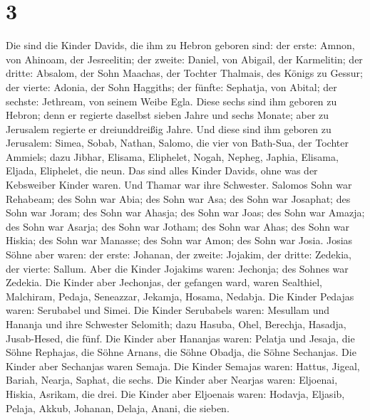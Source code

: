\hypertarget{section-2}{%
\section{3}\label{section-2}}

 Die sind die Kinder Davids, die ihm zu Hebron geboren sind:
der erste: Amnon, von Ahinoam, der Jesreelitin; der zweite: Daniel, von
Abigail, der Karmelitin;  der dritte: Absalom, der Sohn
Maachas, der Tochter Thalmais, des Königs zu Gessur; der vierte: Adonia,
der Sohn Haggiths;  der fünfte: Sephatja, von Abital; der
sechste: Jethream, von seinem Weibe Egla.  Diese sechs sind
ihm geboren zu Hebron; denn er regierte daselbst sieben Jahre und sechs
Monate; aber zu Jerusalem regierte er dreiunddreißig Jahre. 
Und diese sind ihm geboren zu Jerusalem: Simea, Sobab, Nathan, Salomo,
die vier von Bath-Sua, der Tochter Ammiels;  dazu Jibhar,
Elisama, Eliphelet,  Nogah, Nepheg, Japhia, 
Elisama, Eljada, Eliphelet, die neun.  Das sind alles Kinder
Davids, ohne was der Kebsweiber Kinder waren. Und Thamar war ihre
Schwester.  Salomos Sohn war Rehabeam; des Sohn war Abia;
des Sohn war Asa; des Sohn war Josaphat;  des Sohn war
Joram; des Sohn war Ahasja; des Sohn war Joas;  des Sohn
war Amazja; des Sohn war Asarja; des Sohn war Jotham;  des
Sohn war Ahas; des Sohn war Hiskia; des Sohn war Manasse; 
des Sohn war Amon; des Sohn war Josia.  Josias Söhne aber
waren: der erste: Johanan, der zweite: Jojakim, der dritte: Zedekia, der
vierte: Sallum.  Aber die Kinder Jojakims waren: Jechonja;
des Sohnes war Zedekia.  Die Kinder aber Jechonjas, der
gefangen ward, waren Sealthiel,  Malchiram, Pedaja,
Seneazzar, Jekamja, Hosama, Nedabja.  Die Kinder Pedajas
waren: Serubabel und Simei. Die Kinder Serubabels waren: Mesullam und
Hananja und ihre Schwester Selomith;  dazu Hasuba, Ohel,
Berechja, Hasadja, Jusab-Hesed, die fünf.  Die Kinder aber
Hananjas waren: Pelatja und Jesaja, die Söhne Rephajas, die Söhne
Arnans, die Söhne Obadja, die Söhne Sechanjas.  Die Kinder
aber Sechanjas waren Semaja. Die Kinder Semajas waren: Hattus, Jigeal,
Bariah, Nearja, Saphat, die sechs.  Die Kinder aber Nearjas
waren: Eljoenai, Hiskia, Asrikam, die drei.  Die Kinder
aber Eljoenais waren: Hodavja, Eljasib, Pelaja, Akkub, Johanan, Delaja,
Anani, die sieben.

